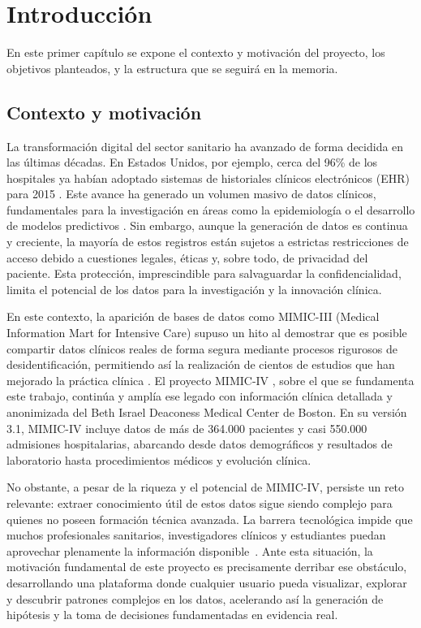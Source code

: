 \chapter{Introducción}

En este primer capítulo se expone el contexto y motivación del proyecto, los objetivos planteados, y la estructura que se seguirá en la memoria.

\section{Contexto y motivación}

La transformación digital del sector sanitario ha avanzado de forma decidida en las últimas décadas. En Estados Unidos, por ejemplo, cerca del 96\% de los hospitales ya habían adoptado sistemas de historiales clínicos electrónicos (EHR) para 2015 \cite{Henry2016_EHR}. Este avance ha generado un volumen masivo de datos clínicos, fundamentales para la investigación en áreas como la epidemiología o el desarrollo de modelos predictivos \cite{Halevy2009_data}. Sin embargo, aunque la generación de datos es continua y creciente, la mayoría de estos registros están sujetos a estrictas restricciones de acceso debido a cuestiones legales, éticas y, sobre todo, de privacidad del paciente. Esta protección, imprescindible para salvaguardar la confidencialidad, limita el potencial de los datos para la investigación y la innovación clínica.

En este contexto, la aparición de bases de datos como MIMIC-III \cite{MIMICIII_paper} (Medical Information Mart for Intensive Care) supuso un hito al demostrar que es posible compartir datos clínicos reales de forma segura mediante procesos rigurosos de desidentificación, permitiendo así la realización de cientos de estudios que han mejorado la práctica clínica \cite{Kallout2025_contribution}. El proyecto MIMIC-IV \cite{MIMICIV_paper, MIMICIV_dataset}, sobre el que se fundamenta este trabajo, continúa y amplía ese legado con información clínica detallada y anonimizada del Beth Israel Deaconess Medical Center de Boston. En su versión 3.1, MIMIC-IV incluye datos de más de 364.000 pacientes y casi 550.000 admisiones hospitalarias, abarcando desde datos demográficos y resultados de laboratorio hasta procedimientos médicos y evolución clínica.

\newpage
No obstante, a pesar de la riqueza y el potencial de MIMIC-IV, persiste un reto relevante: extraer conocimiento útil de estos datos sigue siendo complejo para quienes no poseen formación técnica avanzada. La barrera tecnológica impide que muchos profesionales sanitarios, investigadores clínicos y estudiantes puedan aprovechar plenamente la información disponible~\cite{Khaled2025,AlAttrach2025,Gupta2022}. Ante esta situación, la motivación fundamental de este proyecto es precisamente derribar ese obstáculo, desarrollando una plataforma donde cualquier usuario pueda visualizar, explorar y descubrir patrones complejos en los datos, acelerando así la generación de hipótesis y la toma de decisiones fundamentadas en evidencia real.


